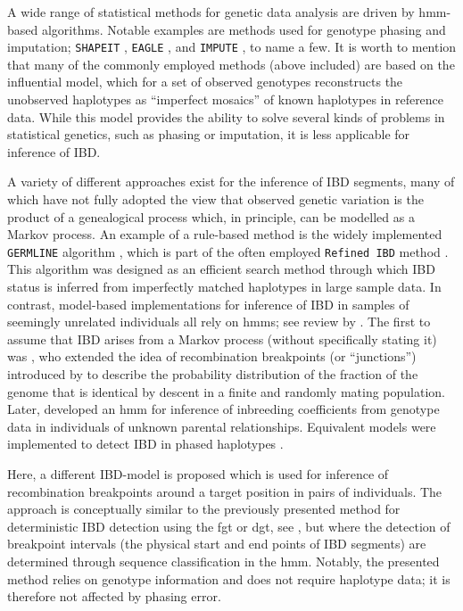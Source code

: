 A wide range of statistical methods for genetic data analysis are driven by \gls{hmm}-based algorithms.
Notable examples are methods used for genotype phasing and imputation; \eg \texttt{SHAPEIT} \citep{Delaneau:2011iu},
\texttt{EAGLE} \citep{loh2016fast,Loh:2016bl}, and
\texttt{IMPUTE} \citep{Howie:2009hq,Howie:2011ia}, to name a few.
It is worth to mention that many of the commonly employed methods (above included) are based on the influential \citet{Li:2003uz} model, which for a set of observed genotypes reconstructs the unobserved haplotypes as ``imperfect mosaics'' of known haplotypes in reference data.
While this model provides the ability to solve several kinds of problems in statistical genetics, such as phasing or imputation, it is less applicable for inference of IBD.

A variety of different approaches exist for the inference of IBD segments, many of which have not fully adopted the view that observed genetic variation is the product of a genealogical process which, in principle, can be modelled as a Markov process.
An example of a rule-based method is the widely implemented \texttt{GERMLINE} algorithm \citep{Gusev:2009hd}, which is part of the often employed \texttt{Refined\,IBD} method \citep{Browning:2013eh}.
This algorithm was designed as an efficient search method through which IBD status is inferred from imperfectly matched haplotypes in large sample data.
In contrast, model-based implementations for inference of IBD in samples of seemingly unrelated individuals all rely on \glspl{hmm}; see review by \citet{Thompson:2013cj}.
The first to assume that IBD arises from a Markov process (without specifically stating it) was \citet{Stam:1980gs}, who extended the idea of recombination breakpoints (or ``junctions'') introduced by \citet{Fisher:1949vh,fisher1954} to describe the probability distribution of the fraction of the genome that is identical by descent in a finite and randomly mating population.
Later, \citet{Leutenegger:2003is} developed an \gls{hmm} for inference of inbreeding coefficients from genotype data in individuals of unknown parental relationships.
Equivalent models were implemented to detect IBD in phased haplotypes \citep[\eg][]{Purcell:2007dg,Browning:2008es}.

Here, a different IBD-model is proposed which is used for inference of recombination breakpoints around a target position in pairs of individuals.
The approach is conceptually similar to the previously presented method for deterministic IBD detection using the \gls{fgt} or \gls{dgt}, see , but where the detection of breakpoint intervals (\ie the physical start and end points of IBD segments) are determined through sequence classification in the \gls{hmm}.
Notably, the presented method relies on genotype information and does not require haplotype data; it is therefore not affected by phasing error.

